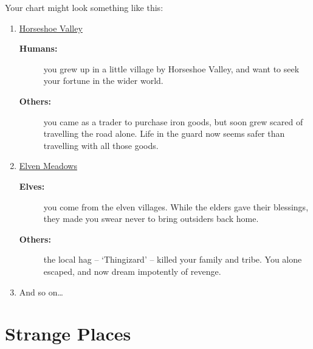 \begin{multicols}{2}
\needspace{8em}
Your chart might look something like this:
\begin{enumerate}
  \item
  \underline{Horseshoe Valley}
  \begin{description}
    \item[\textbf{Humans:}] you grew up in a little \gls{village} by Horseshoe Valley, and want to seek your fortune in the wider world.
    \item[\textbf{Others:}] you came as a trader to purchase iron goods, but soon grew scared of travelling the road alone.
    Life in the \gls{guard} now seems safer than travelling with all those goods.
  \end{description}
  \item
  \underline{Elven Meadows}
  \begin{description}
    \item[\textbf{Elves:}]
    you come from the elven villages.
    While the elders gave their blessings, they made you swear never to bring outsiders back home.
    \item[\textbf{Others:}]
    the local hag -- `Thingizard' -- killed your family and tribe.
    You alone escaped, and now dream impotently of revenge.
  \end{description}
  \item
  And so on\ldots
\end{enumerate}

\end{multicols}

\section{Strange Places}

